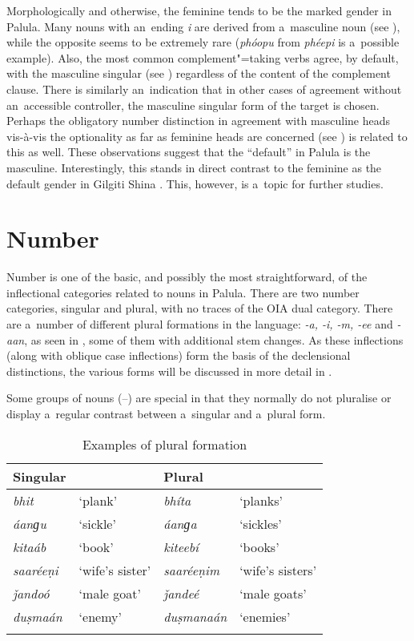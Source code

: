 Morphologically and otherwise, the feminine tends to be the marked gender in Palula. Many nouns with an~ending \textit{i} are derived from a~masculine noun (see ), while the opposite seems to be extremely rare (\textit{phóopu} from \textit{phéepi} is a~possible example). Also, the most common complement"=taking verbs agree, by default, with the masculine singular (see ) regardless of the content of the complement clause. There is similarly an~indication that in other cases of agreement without an~accessible controller, the masculine singular form of the target is chosen. Perhaps the obligatory number distinction in agreement with masculine heads vis-à-vis the optionality as far as feminine heads are concerned (see ) is related to this as well. These observations suggest that the ``default'' in Palula is the masculine. Interestingly, this stands in direct contrast to the feminine as the default gender in Gilgiti Shina \citep[176]{hookzia2005}. This, however, is a~topic for further studies.

\section{Number}
\label{sec:4-4}

Number is one of the basic, and possibly the most straightforward, of the inflectional categories related to nouns in Palula. There are two number categories, singular and plural, with no traces of the OIA dual category. There are a~number of different plural formations in the language: \textit{-a, -i, -m, -ee} and \textit{-aan}, as seen in , some of them with additional stem changes. As these inflections (along with oblique case inflections) form the basis of the declensional distinctions, the various forms will be discussed in more detail in . 

Some groups of nouns (--) are special in that they normally do not pluralise or display a~regular contrast between a~singular and a~plural form.



\begin{table}[ht]
\caption{Examples of plural formation}
\begin{tabularx}{\textwidth}{ Q Q Q Q }
\lsptoprule
Singular &
&
Plural &
\\\midrule
\textit{bhit} &
`plank' &
\textit{bhíta} &
`planks'\\
\textit{áanɡu} &
`sickle' &
\textit{áanɡa} &
`sickles'\\
\textit{kitaáb} &
`book' &
\textit{kiteebí} &
`books'\\
\textit{saaréeṇi} &
`wife's sister' &
\textit{saaréeṇim} &
`wife's sisters'\\
\textit{ǰandoó} &
`male goat' &
\textit{ǰandeé} &
`male goats'\\
\textit{duṣmaán} &
`enemy' &
\textit{duṣmanaán} &
`enemies'\\\lspbottomrule
\end{tabularx}
\label{tab:4-5}
\end{table}

